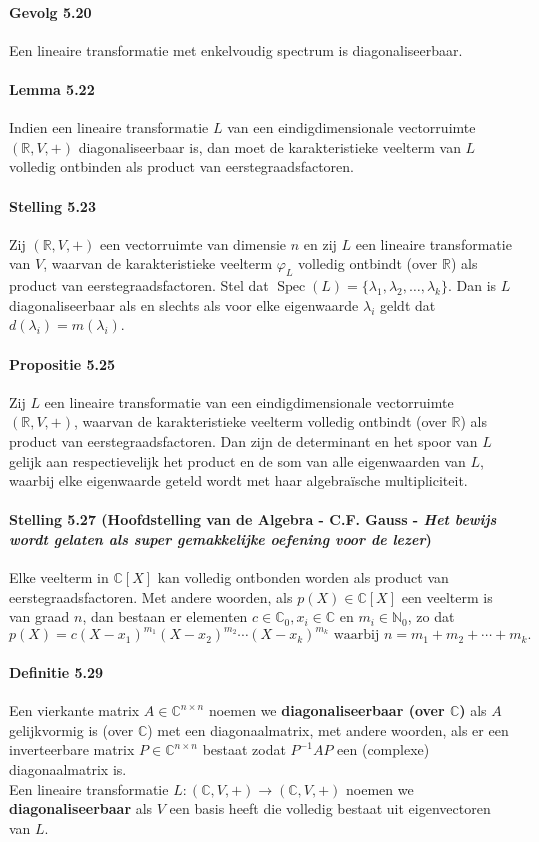 \documentclass[11pt,oneside,a4paper]{article}
\DeclareMathOperator{\Spec}{Spec}
\begin{document}
	\paragraph{Gevolg 5.20}
		Een lineaire transformatie met enkelvoudig spectrum is diagonaliseerbaar.
	\paragraph{Lemma 5.22}	
		Indien een lineaire transformatie $L$ van een eindigdimensionale vectorruimte $(\mathbb{R},V,+)$ diagonaliseerbaar is, dan moet de karakteristieke veelterm van $L$ volledig ontbinden als product van eerstegraadsfactoren.
	\paragraph{Stelling 5.23}
		Zij $(\mathbb{R},V,+)$ een vectorruimte van dimensie $n$ en zij $L$ een lineaire transformatie van $V$, waarvan de karakteristieke veelterm $\varphi_L$ volledig ontbindt (over $\mathbb{R}$) als product van eerstegraadsfactoren. Stel dat $\Spec(L)= \{\lambda_1,\lambda_2,\ldots, \lambda_k\}$. Dan is $L$ diagonaliseerbaar als en slechts als voor elke eigenwaarde $\lambda_i$ geldt dat $d(\lambda_i)=m(\lambda_i)$.
	\paragraph{Propositie 5.25}	
		Zij $L$ een lineaire transformatie van een eindigdimensionale vectorruimte $(\mathbb{R},V,+)$, waarvan de karakteristieke veelterm volledig ontbindt (over $\mathbb{R}$) als product van eerstegraadsfactoren. Dan zijn de determinant en het spoor van $L$ gelijk aan respectievelijk het product en de som van alle eigenwaarden van $L$, waarbij elke eigenwaarde geteld wordt met haar algebraïsche multipliciteit.
	\paragraph{Stelling 5.27 (Hoofdstelling van de Algebra - C.F. Gauss - \textit{Het bewijs wordt gelaten als super gemakkelijke oefening voor de lezer})}	
		Elke veelterm in $\mathbb{C}[X]$ kan volledig ontbonden worden als product van eerstegraadsfactoren. Met andere woorden, als $p(X) \in \mathbb{C}[X]$ een veelterm is van graad $n$, dan bestaan er elementen $c \in \mathbb{C}_0, x_i \in \mathbb{C}$ en $m_i \in \mathbb{N}_0$, zo dat $$p(X)=c(X-x_1)^{m_1}(X-x_2)^{m_2}\cdots (X-x_k)^{m_k} \text{ waarbij } n = m_1 + m_2 + \cdots + m_k.$$
	\paragraph{Definitie 5.29}	
		Een vierkante matrix $A \in \mathbb{C}^{n\times n}$ noemen we \textbf{diagonaliseerbaar (over $\mathbb{C}$)} als $A$ gelijkvormig is (over $\mathbb{C}$) met een diagonaalmatrix, met andere woorden, als er een inverteerbare matrix $P \in \mathbb{C}^{n\times n}$ bestaat zodat $P^{-1}AP$ een (complexe) diagonaalmatrix is. \\ Een lineaire transformatie $L: (\mathbb{C},V,+) \to (\mathbb{C},V,+)$ noemen we \textbf{diagonaliseerbaar} als $V$ een basis heeft die volledig bestaat uit eigenvectoren van $L$.
\end{document}
